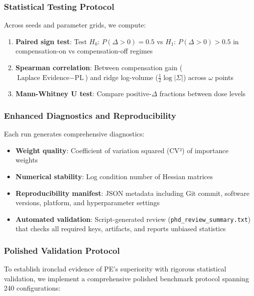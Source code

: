 \documentclass[conference]{IEEEtran}
\begin{document}
\subsubsection{Statistical Testing Protocol}
Across seeds and parameter grids, we compute:
\begin{enumerate}
\item \textbf{Paired sign test}: Test $H_0$: $P(\Delta>0)=0.5$ vs $H_1$: $P(\Delta>0)>0.5$ in compensation-on vs compensation-off regimes
\item \textbf{Spearman correlation}: Between compensation gain ($\text{Laplace Evidence}-\text{PL}$) and ridge log-volume ($\frac{1}{2}\log|\Sigma|$) across $\omega$ points
\item \textbf{Mann-Whitney U test}: Compare positive-$\Delta$ fractions between dose levels
\end{enumerate}

\subsubsection{Enhanced Diagnostics and Reproducibility}
Each run generates comprehensive diagnostics:
\begin{itemize}
\item \textbf{Weight quality}: Coefficient of variation squared (CV²) of importance weights
\item \textbf{Numerical stability}: Log condition number of Hessian matrices
\item \textbf{Reproducibility manifest}: JSON metadata including Git commit, software versions, platform, and hyperparameter settings
\item \textbf{Automated validation}: Script-generated review (\texttt{phd\_review\_summary.txt}) that checks all required keys, artifacts, and reports unbiased statistics
\end{itemize}

\subsubsection{Polished Validation Protocol}
To establish ironclad evidence of PE's superiority with rigorous statistical validation, we implement a comprehensive polished benchmark protocol spanning 240 configurations:
\end{document}
